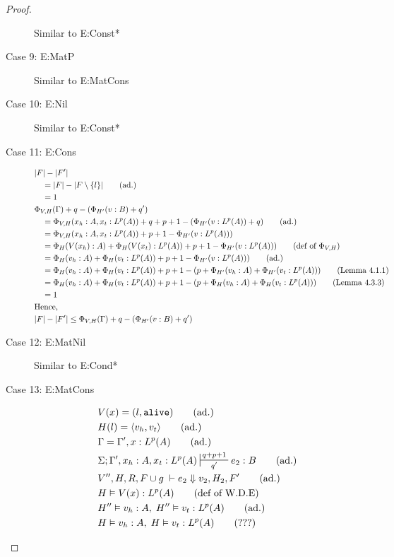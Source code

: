 \documentclass[11pt]{article}
\newcommand{\irl}[1]{\mathtt{#1}}
\begin{document}
\begin{proof}
\begin{description}
  Similar to E:Const*
  \item[Case 9: E:MatP]
  Similar to E:MatCons
  \item[Case 10: E:Nil]
  Similar to E:Const*
  \item[Case 11: E:Cons]
  \begin{align*}
  &|F| - |F'|\\
  &\quad = |F| - |F \setminus \{l\}| \tag{ad.}\\
  &\quad = 1\\
  &\Phi_{V,H}(\Gamma) +q - (\Phi_{H'}(v:B) + q')\\
  &\quad = \Phi_{V,H}(x_h : A,x_t:L^p(A)) + q + p + 1 - (\Phi_{H'}(v:L^p(A)) + q) \tag{ad.}\\
  &\quad = \Phi_{V,H}(x_h : A,x_t:L^p(A)) + p + 1 - \Phi_{H'}(v:L^p(A))) \\
  &\quad = \Phi_{H}(V(x_h):A) + \Phi_{H}(V(x_t):L^p(A)) + p + 1 - \Phi_{H'}(v:L^p(A))) \tag{def of $\Phi_{V,H}$}\\
  &\quad = \Phi_{H}(v_h:A) + \Phi_{H}(v_t:L^p(A)) + p + 1 - \Phi_{H'}(v:L^p(A))) \tag{ad.}\\
  &\quad = \Phi_{H}(v_h:A) + \Phi_{H}(v_t:L^p(A)) + p + 1 - (p + \Phi_{H'}(v_h:A) + \Phi_{H'}(v_t:L^p(A))) \tag{Lemma 4.1.1}\\
  &\quad = \Phi_{H}(v_h:A) + \Phi_{H}(v_t:L^p(A)) + p + 1 - (p + \Phi_{H}(v_h:A) + \Phi_{H}(v_t:L^p(A))) \tag{Lemma 4.3.3}\\
  &\quad = 1\\
  &\text{Hence,}\\
  &|F| - |F'| \le \Phi_{V,H}(\Gamma) +q - (\Phi_{H'}(v:B) + q')
  \end{align*}
  \item[Case 12: E:MatNil]
  Similar to E:Cond*
  \item[Case 13: E:MatCons]
  \begin{align*}
  &V(x) = (l,\irl{alive}) \tag{ad.}\\
  &H(l) = \pairexcst{v_h}{v_t} \tag{ad.}\\
  &\Gamma = \Gamma', x : L^p(A) \tag{ad.}\\
  &\Sigma; \Gamma', x_h : A, x_t : L^p(A) \sststile{q'}{q + p + 1} e_2 : B \tag{ad.}\\
  &V'',H,R,F \cup g \; \vdash e_2 \Downarrow v_2, H_2, F' \tag{ad.} \\
  &H \vDash V(x) : L^p(A) \tag{def of W.D.E}\\
  &H''\vDash v_h : A,\; H'' \vDash v_t : L^p(A) \tag{ad.}\\
  &H\vDash v_h : A,\; H \vDash v_t : L^p(A) \tag{???}\\

\end{align*}
\end{description}
\end{proof}
\end{document}
